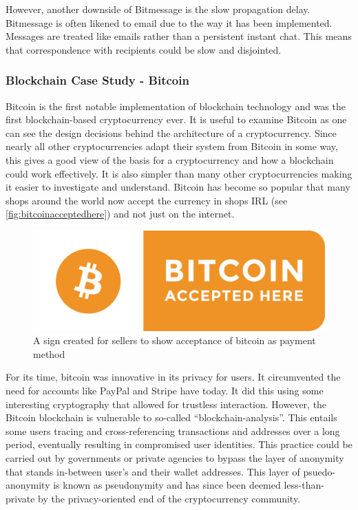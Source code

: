 \documentclass{article}
\begin{document}
However, another downside of Bitmessage is the slow propagation delay. Bitmessage is often likened to email due to the way it has been implemented. Messages are treated like emails rather than a persistent instant chat. This means that correspondence with recipients could be slow and disjointed.

\subsubsection{Blockchain Case Study - Bitcoin}
Bitcoin\cite{bitcoin_paper} is the first notable implementation of blockchain technology and was the first blockchain-based cryptocurrency ever. It is useful to examine Bitcoin as one can see the design decisions behind the architecture of a cryptocurrency. Since nearly all other cryptocurrencies adapt their system from Bitcoin in some way, this gives a good view of the basis for a cryptocurrency and how a blockchain could work effectively. It is also simpler than many other cryptocurrencies making it easier to investigate and understand. Bitcoin has become so popular that many shops around the world now accept the currency in shops IRL (see \autoref{fig:bitcoinacceptedhere}) and not just on the internet.
\begin{figure}[h]
    \centering
    \includegraphics[width=0.5\linewidth]{Images/bitcoin_accepted_here.png}
    \caption{A sign created for sellers to show acceptance of bitcoin as payment method}
    \label{fig:bitcoinacceptedhere}
\end{figure}
For its time, bitcoin was innovative in its privacy for users. It circumvented the need for accounts like PayPal and Stripe have today. It did this using some interesting cryptography that allowed for trustless interaction. However, the Bitcoin blockchain is vulnerable to so-called ``blockchain-analysis''. This entails some users tracing and cross-referencing transactions and addresses over a long period, eventually resulting in compromised user identities. This practice could be carried out by governments or private agencies to bypass the layer of anonymity that stands in-between user's and their wallet addresses. This layer of psuedo-anonymity is known as pseudonymity and has since been deemed less-than-private by the privacy-oriented end of the cryptocurrency community.
\end{document}
